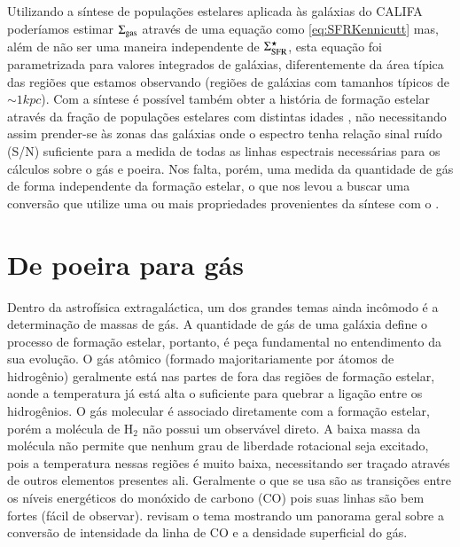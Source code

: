 Utilizando a síntese de populações estelares aplicada às galáxias do CALIFA poderíamos estimar $\Sigma_{\mathrm{gas}}$ através de uma equação como \eqref{eq:SFRKennicutt} mas, além de não ser uma maneira independente de $\Sigma_{\mathrm{SFR}}^\star$, esta equação foi parametrizada para valores integrados de galáxias, diferentemente da área típica das regiões que estamos observando (regiões de galáxias com tamanhos típicos de $\sim 1 kpc$). Com a síntese é possível também obter a história de formação estelar através da fração de populações estelares com distintas idades \citep{Asari.etal.2007a}, não necessitando assim prender-se às zonas das galáxias onde o espectro tenha relação sinal ruído (S/N) suficiente para a medida de todas as linhas espectrais necessárias para os cálculos sobre o gás e poeira. Nos falta, porém, uma medida da quantidade de gás de forma independente da formação estelar, o que nos levou a buscar uma conversão que utilize uma ou mais propriedades provenientes da síntese com o \starlight.


\section{De poeira para gás}
\label{sec:intro:dust2gas}

Dentro da astrofísica extragaláctica, um dos grandes temas ainda incômodo é a determinação de massas de gás. A quantidade de gás de uma galáxia define o processo de formação estelar, portanto, é peça fundamental no entendimento da sua evolução. O gás atômico (formado majoritariamente por átomos de hidrogênio) geralmente está nas partes de fora das regiões de formação estelar, aonde a temperatura já está alta o suficiente para quebrar a ligação entre os hidrogênios. O gás molecular é associado diretamente com a formação estelar, porém a molécula de $\mathrm{H}_2$ não possui um observável direto. A baixa massa da molécula não permite que nenhum grau de liberdade rotacional seja excitado, pois a temperatura nessas regiões é muito baixa, necessitando ser traçado através de outros elementos presentes ali. Geralmente o que se usa são as transições entre os níveis energéticos do monóxido de carbono (CO) pois suas linhas são bem fortes (fácil de observar). \citet{Bolatto.etal.2013a} revisam o tema mostrando um panorama geral sobre a conversão de intensidade da linha de CO e a densidade superficial do gás.


